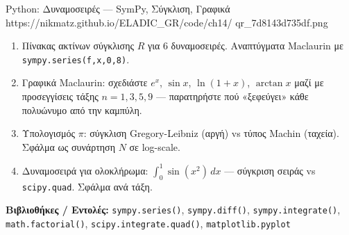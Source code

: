 \begin{pybox}{Python: Δυναμοσειρές — SymPy, Σύγκλιση, Γραφικά}%
             {https://nikmatz.github.io/ELADIC_GR/code/ch14/}%
             {qr_7d8143d735df.png}
\label{py:ch14_power_series}
\begin{enumerate}[label=(\alph*),itemsep=2pt]
  \item Πίνακας ακτίνων σύγκλισης $R$ για 6 δυναμοσειρές.
    Αναπτύγματα Maclaurin με \texttt{sympy.series(f,x,0,8)}.
  \item Γραφικά Maclaurin: σχεδιάστε $e^x$, $\sin x$, $\ln(1+x)$,
    $\arctan x$ μαζί με προσεγγίσεις τάξης $n=1,3,5,9$ —
    παρατηρήστε πού «ξεφεύγει» κάθε πολυώνυμο από την καμπύλη.
  \item Υπολογισμός $\pi$: σύγκλιση Gregory-Leibniz (αργή)
    vs τύπος Machin (ταχεία). Σφάλμα ως συνάρτηση $N$ σε log-scale.
  \item Δυναμοσειρά για ολοκλήρωμα: $\int_0^1\!\sin(x^2)\,dx$
    — σύγκριση σειράς vs \texttt{scipy.quad}. Σφάλμα ανά τάξη.
\end{enumerate}
\medskip
\textbf{Βιβλιοθήκες / Εντολές:}
\texttt{sympy.series()}, \texttt{sympy.diff()},
\texttt{sympy.integrate()}, \texttt{math.factorial()},
\texttt{scipy.integrate.quad()}, \texttt{matplotlib.pyplot}
\end{pybox}
